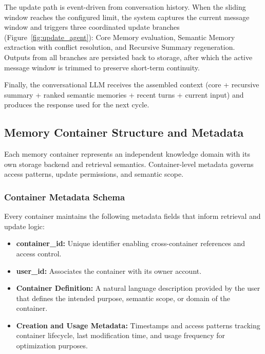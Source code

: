 \documentclass[12pt,a4paper]{article}
\begin{document}
The update path is event-driven from conversation history. When the sliding window reaches the configured limit, the system captures the current message window and triggers three coordinated update branches (Figure~\ref{fig:update_agent}): Core Memory evaluation, Semantic Memory extraction with conflict resolution, and Recursive Summary regeneration. Outputs from all branches are persisted back to storage, after which the active message window is trimmed to preserve short-term continuity.

Finally, the conversational LLM receives the assembled context (core + recursive summary + ranked semantic memories + recent turns + current input) and produces the response used for the next cycle.

\subsection{Memory Container Structure and Metadata}

Each memory container represents an independent knowledge domain with its own storage backend and retrieval semantics. Container-level metadata governs access patterns, update permissions, and semantic scope.

\subsubsection{Container Metadata Schema}

Every container maintains the following metadata fields that inform retrieval and update logic:

\begin{itemize}
    \item \textbf{container\_id:} Unique identifier enabling cross-container references and access control.
    
    \item \textbf{user\_id:} Associates the container with its owner account.
    
    \item \textbf{Container Definition:} A natural language description provided by the user that defines the intended purpose, semantic scope, or domain of the container. 
    
    \item \textbf{Creation and Usage Metadata:} Timestamps and access patterns tracking container lifecycle, last modification time, and usage frequency for optimization purposes.
\end{itemize}
\end{document}
